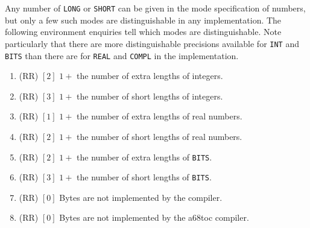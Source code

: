 Any number of \verb|LONG| or \verb|SHORT| can be given in the mode
specification of numbers, but only a few such modes are distinguishable
in any implementation. The following environment enquiries tell which
modes are distinguishable. Note particularly that there are more
distinguishable precisions available for \verb|INT| and \verb|BITS|
than there are for \verb|REAL| and \verb|COMPL| in the
 implementation.
\begin{enumerate}
\item {} (RR) $[2]$ \newline
$1+$ the number of extra lengths of integers.
\item {} (RR) $[3]$ \newline
$1+$ the number of short lengths of integers.
\item {} (RR) $[1]$ \newline
$1+$ the number of extra lengths of real numbers.
\item {} (RR) $[2]$ \newline
$1+$ the number of short lengths of real numbers.
\item {} (RR) $[2]$ \newline
$1+$ the number of extra lengths of \verb|BITS|.
\item {} (RR) $[3]$ \newline
$1+$ the number of short lengths of \verb|BITS|.
\item {} (RR) $[0]$ \newline
Bytes are not implemented by the
 compiler.
\item {} (RR) $[0]$ \newline
Bytes are not implemented by the a68toc compiler.
\end{enumerate}

